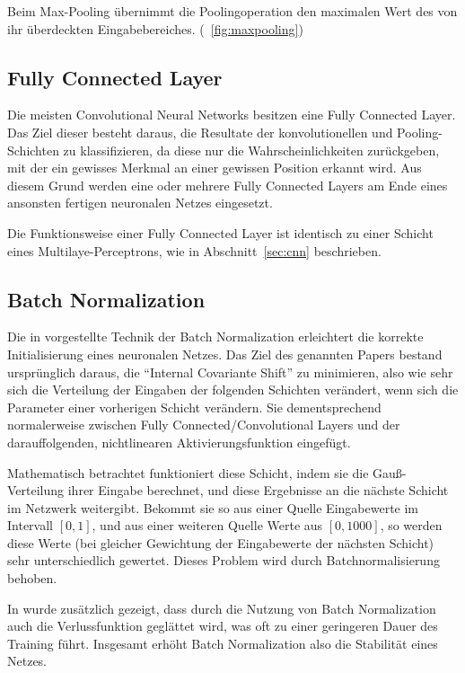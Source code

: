 Beim Max-Pooling übernimmt die Poolingoperation den maximalen Wert des von ihr überdeckten Eingabebereiches. (\vgl \figurename~\ref{fig:maxpooling})

\subsection{Fully Connected Layer}
\label{ssec:fcn}
Die meisten Convolutional Neural Networks besitzen eine Fully Connected Layer. Das Ziel dieser besteht daraus, die Resultate der konvolutionellen und Pooling-Schichten zu klassifizieren, da diese nur die Wahrscheinlichkeiten zurückgeben, mit der ein gewisses Merkmal an einer gewissen Position erkannt wird. Aus diesem Grund werden eine oder mehrere Fully Connected Layers am Ende eines ansonsten fertigen neuronalen Netzes eingesetzt. \cite{geva}

Die Funktionsweise einer Fully Connected Layer ist identisch zu einer Schicht eines Multilaye-Perceptrons, wie in Abschnitt~\ref{sec:cnn} beschrieben.

\subsection{Batch Normalization}
\label{ssec:bn}

Die in \cite{ioffe_15} vorgestellte Technik der Batch Normalization erleichtert die korrekte Initialisierung eines neuronalen Netzes. Das Ziel des genannten Papers bestand ursprünglich daraus, die \enquote{Internal Covariante Shift} zu minimieren, also wie sehr sich die Verteilung der Eingaben der folgenden Schichten verändert, wenn sich die Parameter einer vorherigen Schicht verändern. Sie dementsprechend normalerweise zwischen Fully Connected/Convolutional Layers und der darauffolgenden, nichtlinearen Aktivierungsfunktion eingefügt. \cite{cs231n}

Mathematisch betrachtet funktioniert diese Schicht, indem sie die Gauß-Verteilung ihrer Eingabe berechnet, und diese Ergebnisse an die nächste Schicht im Netzwerk weitergibt. \cite{cs231n} Bekommt sie so \bspw aus einer Quelle Eingabewerte im Intervall $\left[0, 1\right]$, und aus einer weiteren Quelle Werte aus $\left[0, 1000\right]$, so werden diese Werte (bei gleicher Gewichtung der Eingabewerte der nächsten Schicht) sehr unterschiedlich gewertet. Dieses Problem wird durch Batchnormalisierung behoben.

In \cite{santurkar_18} wurde zusätzlich gezeigt, dass durch die Nutzung von Batch Normalization auch die Verlussfunktion geglättet wird, was oft zu einer geringeren Dauer des Training führt. Insgesamt erhöht Batch Normalization also die Stabilität eines Netzes.

